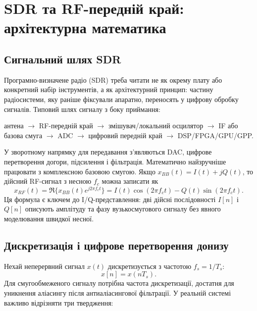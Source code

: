 \chapter{SDR та RF-передній край: архітектурна математика}
\label{ch:sdr-rf-architecture}


\section{Сигнальний шлях SDR}

Програмно-визначене радіо (SDR) треба читати не як окрему плату або конкретний набір інструментів, а як архітектурний принцип: частину радіосистеми, яку раніше фіксували апаратно, переносять у цифрову обробку сигналів. Типовий шлях сигналу з боку приймання:

\begin{center}
антена $\to$ RF-передній край $\to$ змішувач/локальний осцилятор $\to$ IF або базова смуга $\to$ ADC $\to$ цифровий передній край $\to$ DSP/FPGA/GPU/GPP.
\end{center}

У зворотному напрямку для передавання з'являються DAC, цифрове перетворення догори, підсилення і фільтрація. Математично найзручніше працювати з комплексною базовою смугою. Якщо $x_{BB}(t)=I(t)+jQ(t)$, то дійсний RF-сигнал з несною $f_c$ можна записати як
\begin{equation}
  x_{RF}(t)=\Re\{x_{BB}(t)e^{j2\pi f_c t}\}
  = I(t)\cos(2\pi f_c t)-Q(t)\sin(2\pi f_c t).
\end{equation}
Ця формула є ключем до I/Q-представлення: дві дійсні послідовності $I[n]$ і $Q[n]$ описують амплітуду та фазу вузькосмугового сигналу без явного моделювання швидкої несної.

\section{Дискретизація і цифрове перетворення донизу}

Нехай неперервний сигнал $x(t)$ дискретизується з частотою $f_s=1/T_s$:
\begin{equation}
  x[n] = x(nT_s).
\end{equation}
Для смугообмеженого сигналу потрібна частота дискретизації, достатня для уникнення аліасингу після антиаліасингової фільтрації. У реальній системі важливо відрізняти три твердження:


